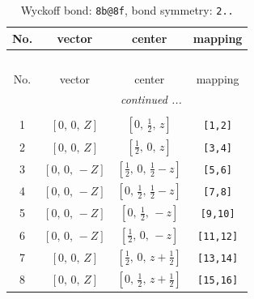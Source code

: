 \documentclass[fleqn,8pt]{jsarticle}
\begin{document}
\begin{longtable}{cccc}
\caption{Wyckoff bond: {\tt 8b@8f}, bond symmetry: {\tt 2..}}
 \\
 \hline \hline
No. & vector & center & mapping \\ \hline \endfirsthead

\multicolumn{3}{l}{\tablename\ \thetable{}} \\
 \hline \hline
No. & vector & center & mapping \\ \hline \endhead

 \hline \hline
\multicolumn{3}{r}{\footnotesize\it continued ...} \\ \endfoot

 \hline \hline
\multicolumn{3}{r}{} \\ \endlastfoot

1 & $\left[ 0,\, 0,\, Z \right]$ & $\left[ 0,\, \frac{1}{2},\, z \right]$ & {\tt [1,2]} \\ \hline
2 & $\left[ 0,\, 0,\, Z \right]$ & $\left[ \frac{1}{2},\, 0,\, z \right]$ & {\tt [3,4]} \\ \hline
3 & $\left[ 0,\, 0,\, - Z \right]$ & $\left[ \frac{1}{2},\, 0,\, \frac{1}{2} - z \right]$ & {\tt [5,6]} \\ \hline
4 & $\left[ 0,\, 0,\, - Z \right]$ & $\left[ 0,\, \frac{1}{2},\, \frac{1}{2} - z \right]$ & {\tt [7,8]} \\ \hline
5 & $\left[ 0,\, 0,\, - Z \right]$ & $\left[ 0,\, \frac{1}{2},\, - z \right]$ & {\tt [9,10]} \\ \hline
6 & $\left[ 0,\, 0,\, - Z \right]$ & $\left[ \frac{1}{2},\, 0,\, - z \right]$ & {\tt [11,12]} \\ \hline
7 & $\left[ 0,\, 0,\, Z \right]$ & $\left[ \frac{1}{2},\, 0,\, z + \frac{1}{2} \right]$ & {\tt [13,14]} \\ \hline
8 & $\left[ 0,\, 0,\, Z \right]$ & $\left[ 0,\, \frac{1}{2},\, z + \frac{1}{2} \right]$ & {\tt [15,16]} \\
\end{longtable}
\renewcommand{\arraystretch}{1.2}
\end{document}

